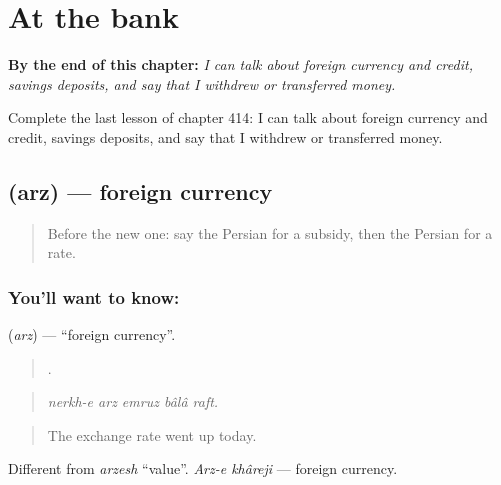 
\chapter{At the bank}
\label{ch:fa-at-the-bank}

\begin{chapteropening}
\textbf{By the end of this chapter:} \emph{I can talk about foreign currency and credit, savings deposits, and say that I withdrew or transferred money.}

Complete the last lesson of chapter 414: I can talk about foreign currency and credit, savings deposits, and say that I withdrew or transferred money.
\end{chapteropening}

\section[\texorpdfstring{\fa{ارز} (arz)}{ارز (arz)}]{ (arz) — foreign currency}

\label{lesson:FA-C414-arz}



\begin{quote}
Before the new one: say the Persian for a subsidy, then the Persian for a rate.
\end{quote}

\subsection*{You'll want to know: }
\textbf{} (\emph{arz}) — \textquotedblleft{}foreign currency\textquotedblright{}.

\begin{quote}
    .
\end{quote}

\begin{quote}
\emph{nerkh-e arz emruz bâlâ raft.}
\end{quote}

\begin{quote}
The exchange rate went up today.
\end{quote}

Different from \emph{arzesh} \textquotedblleft{}value\textquotedblright{}. \emph{Arz-e khâreji} — foreign currency.

